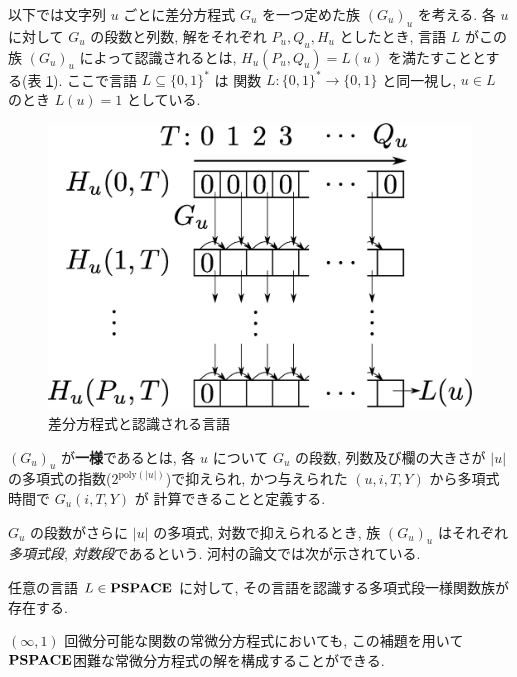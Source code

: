 以下では文字列 $u$ ごとに差分方程式 $G _u$ を一つ定めた族 $(G _u) _u$ を考える. 
各 $u$ に対して $G_u$ の段数と列数, 解をそれぞれ $P_u, Q_u, H_u$ としたとき,
言語 $L$ がこの族 $(G_u)_u$ によって認識されるとは,
$H_u(P_u, Q_u) = L(u)$ を満たすこととする(表 \ref{fig:divp}).
ここで言語 $L \subseteq \{0, 1\} ^*$ は
関数 $L \colon \{0, 1\} ^* \to \{0, 1\}$ と同一視し, 
$u \in L$ のとき $L (u) = 1$ としている. 

 \begin{figure}
  \label{fig:divp}
  \begin{center}
   \includegraphics[height=0.2\textheight]{image/divp.eps}
  \end{center}
  \caption{差分方程式と認識される言語}
 \end{figure}

$(G_u)_u$ が{\bf 一様}であるとは,
各 $u$ について $G _u$ の段数, 列数及び欄の大きさが $|u|$ の多項式の指数($2^{\mathrm{poly} (|u|)}$)で抑えられ, 
かつ与えられた $(u, i, T, Y)$ から多項式時間で $G_u(i, T, Y)$ が
計算できることと定義する.

$G_u$ の段数がさらに $|u|$ の多項式, 対数で抑えられるとき, 
族 $(G_u) _u$ はそれぞれ\emph{多項式段}, \emph{対数段}であるという. 
河村の論文では次が示されている.

\begin{lemma}
 \label{DIVPpolyIsPSPACEhard}
 任意の言語 $L \in \mathbf{PSPACE}$ に対して,
 その言語を認識する多項式段一様関数族が存在する.
\end{lemma}

$(\infty, 1)$ 回微分可能な関数の常微分方程式においても,
この補題を用いて$\mathbf{PSPACE}$困難な常微分方程式の解を構成することができる.

